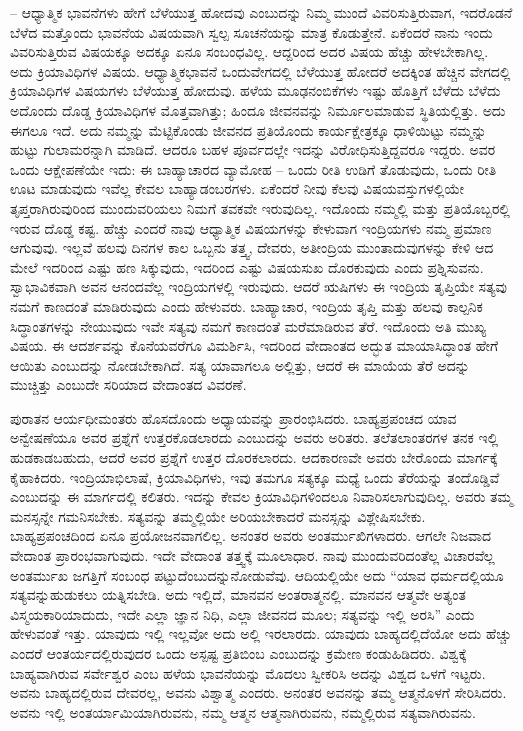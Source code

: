 – ಆಧ್ಯಾತ್ಮಿಕ ಭಾವನೆಗಳು ಹೇಗೆ ಬೆಳೆಯುತ್ತ ಹೋದವು ಎಂಬುದನ್ನು ನಿಮ್ಮ ಮುಂದೆ ವಿವರಿಸುತ್ತಿರುವಾಗ, ಇದರೊಡನೆ ಬೆಳೆದ ಮತ್ತೊಂದು ಭಾವನೆಯ ವಿಷಯವಾಗಿ ಸ್ವಲ್ಪ ಸೂಚನೆಯನ್ನು ಮಾತ್ರ ಕೊಡುತ್ತೇನೆ. ಏಕೆಂದರೆ ನಾನು ಇಂದು ವಿವರಿಸುತ್ತಿರುವ ವಿಷಯಕ್ಕೂ ಅದಕ್ಕೂ ಏನೂ ಸಂಬಂಧವಿಲ್ಲ. ಆದ್ದರಿಂದ ಅದರ ವಿಷಯ ಹೆಚ್ಚು ಹೇಳಬೇಕಾಗಿಲ್ಲ. ಅದು ಕ್ರಿಯಾವಿಧಿಗಳ ವಿಷಯ. ಆಧ್ಯಾತ್ಮಿಕಭಾವನೆ ಒಂದು\break ವೇಗದಲ್ಲಿ ಬೆಳೆಯುತ್ತ ಹೋದರೆ ಅದಕ್ಕಿಂತ ಹೆಚ್ಚಿನ ವೇಗದಲ್ಲಿ ಕ್ರಿಯಾವಿಧಿಗಳ ವಿಷಯಗಳು ಬೆಳೆಯುತ್ತ ಹೋದುವು. ಹಳೆಯ ಮೂಢನಂಬಿಕೆಗಳು ಇಷ್ಟು ಹೊತ್ತಿಗೆ ಬೆಳೆದು ಬೆಳೆದು ಅದೊಂದು ದೊಡ್ಡ ಕ್ರಿಯಾವಿಧಿಗಳ ಮೊತ್ತವಾಗಿತ್ತು; ಹಿಂದೂ ಜೀವನವನ್ನು ನಿರ್ಮೂಲಮಾಡುವ ಸ್ಥಿತಿಯಲ್ಲಿತ್ತು. ಅದು ಈಗಲೂ ಇದೆ. ಅದು ನಮ್ಮನ್ನು ಮೆಟ್ಟಿಕೊಂಡು ಜೀವನದ ಪ್ರತಿಯೊಂದು ಕಾರ್ಯಕ್ಷೇತ್ರಕ್ಕೂ ಧಾಳಿಯಿಟ್ಟು ನಮ್ಮನ್ನು ಹುಟ್ಟು ಗುಲಾಮರನ್ನಾಗಿ ಮಾಡಿದೆ. ಆದರೂ ಬಹಳ ಪೂರ್ವದಲ್ಲೇ ಇದನ್ನು ವಿರೋಧಿಸುತ್ತಿದ್ದವರೂ ಇದ್ದರು. ಅವರ ಒಂದು ಆಕ್ಷೇಪಣೆಯೇ ಇದು: ಈ ಬಾಹ್ಯಾಚಾರದ ವ್ಯಾಮೋಹ – ಒಂದು ರೀತಿ ಉಡಿಗೆ ತೊಡುವುದು, ಒಂದು ರೀತಿ ಊಟ ಮಾಡುವುದು ಇವೆಲ್ಲ ಕೇವಲ ಬಾಹ್ಯಾಡಂಬರಗಳು. ಏಕೆಂದರೆ ನೀವು ಕೆಲವು ವಿಷಯವಸ್ತುಗಳಲ್ಲಿಯೇ ತೃಪ್ತರಾಗಿರುವುರಿಂದ ಮುಂದುವರಿಯಲು ನಿಮಗೆ ತವಕವೇ ಇರುವುದಿಲ್ಲ. ಇದೊಂದು ನಮ್ಮಲ್ಲಿ ಮತ್ತು ಪ್ರತಿಯೊಬ್ಬರಲ್ಲಿ ಇರುವ ದೊಡ್ಡ ಕಷ್ಟ. ಹೆಚ್ಚು ಎಂದರೆ ನಾವು ಆಧ್ಯಾತ್ಮಿಕ ವಿಷಯಗಳನ್ನು ಕೇಳುವಾಗ ಇಂದ್ರಿಯಗಳು ನಮ್ಮ ಪ್ರಮಾಣ ಆಗುವುವು. ಇಲ್ಲವೆ ಹಲವು ದಿನಗಳ ಕಾಲ ಒಬ್ಬನು ತತ್ತ್ವ, ದೇವರು, ಅತೀಂದ್ರಿಯ ಮುಂತಾದುವುಗಳನ್ನು ಕೇಳಿ ಆದ ಮೇಲೆ ಇದರಿಂದ ಎಷ್ಟು ಹಣ ಸಿಕ್ಕುವುದು, ಇದರಿಂದ ಎಷ್ಟು ವಿಷಯಸುಖ ದೊರಕುವುದು ಎಂದು ಪ್ರಶ್ನಿಸುವನು. ಸ್ವಾಭಾವಿಕವಾಗಿ ಅವನ ಆನಂದವೆಲ್ಲ ಇಂದ್ರಿಯಗಳಲ್ಲಿ ಇರುವುದು. ಆದರೆ ಋಷಿಗಳು ಈ ಇಂದ್ರಿಯ ತೃಪ್ತಿಯೇ ಸತ್ಯವು ನಮಗೆ ಕಾಣದಂತೆ ಮಾಡಿರುವುದು ಎಂದು ಹೇಳುವರು. ಬಾಹ್ಯಾಚಾರ, ಇಂದ್ರಿಯ ತೃಪ್ತಿ ಮತ್ತು ಹಲವು ಕಾಲ್ಪನಿಕ ಸಿದ್ಧಾಂತಗಳನ್ನು ನೇಯುವುದು ಇವೇ ಸತ್ಯವು ನಮಗೆ ಕಾಣದಂತೆ ಮರೆಮಾಡಿರುವ ತೆರೆ. ಇದೊಂದು ಅತಿ ಮುಖ್ಯ ವಿಷಯ. ಈ ಆದರ್ಶವನ್ನು ಕೊನೆಯವರೆಗೂ ವಿಮರ್ಶಿಸಿ, ಇದರಿಂದ ವೇದಾಂತದ ಅದ್ಭುತ ಮಾಯಾಸಿದ್ಧಾಂತ ಹೇಗೆ ಆಯಿತು ಎಂಬುದನ್ನು ನೋಡಬೇಕಾಗಿದೆ. ಸತ್ಯ ಯಾವಾಗಲೂ ಅಲ್ಲಿತ್ತು, ಆದರೆ ಈ ಮಾಯೆಯ ತೆರೆ ಅದನ್ನು ಮುಚ್ಚಿತ್ತು ಎಂಬುದೇ ಸರಿಯಾದ ವೇದಾಂತದ ವಿವರಣೆ.

ಪುರಾತನ ಆರ್ಯಧೀಮಂತರು ಹೊಸದೊಂದು ಅಧ್ಯಾಯವನ್ನು ಪ್ರಾರಂಭಿಸಿದರು. ಬಾಹ್ಯಪ್ರಪಂಚದ ಯಾವ ಅನ್ವೇಷಣೆಯೂ ಅವರ ಪ್ರಶ್ನೆಗೆ ಉತ್ತರ\break ಕೊಡಲಾರದು ಎಂಬುದನ್ನು ಅವರು ಅರಿತರು. ತಲೆತಲಾಂತರಗಳ ತನಕ ಇಲ್ಲಿ ಹುಡಕಾಡಬಹುದು, ಆದರೆ ಅವರ ಪ್ರಶ್ನೆಗೆ ಉತ್ತರ ದೊರಕಲಾರದು. ಆದಕಾರಣವೇ ಅವರು ಬೇರೊಂದು ಮಾರ್ಗಕ್ಕೆ ಕೈಹಾಕಿದರು. ಇಂದ್ರಿಯಾಭಿಲಾಷೆ, ಕ್ರಿಯಾವಿಧಿಗಳು, ಇವು ತಮಗೂ ಸತ್ಯಕ್ಕೂ ಮಧ್ಯೆ ಒಂದು ತೆರೆಯನ್ನು ತಂದೊಡ್ಡಿವೆ ಎಂಬುದನ್ನು ಈ ಮಾರ್ಗದಲ್ಲಿ ಕಲಿತರು. ಇದನ್ನು ಕೇವಲ ಕ್ರಿಯಾವಿಧಿಗಳಿಂದಲೂ ನಿವಾರಿಸಲಾಗುವುದಿಲ್ಲ. ಅವರು ತಮ್ಮ ಮನಸ್ಸನ್ನೇ ಗಮನಿಸಬೇಕು. ಸತ್ಯವನ್ನು ತಮ್ಮಲ್ಲಿಯೇ ಅರಿಯಬೇಕಾದರೆ ಮನಸ್ಸನ್ನು ವಿಶ್ಲೇಷಿಸಬೇಕು. ಬಾಹ್ಯಪ್ರಪಂಚದಿಂದ ಏನೂ ಪ್ರಯೋಜನವಾಗಲಿಲ್ಲ. ಅನಂತರ ಅವರು ಅಂತರ್ಮುಖಿಗಳಾದರು. ಆಗಲೇ ನಿಜವಾದ ವೇದಾಂತ ಪ್ರಾರಂಭವಾಗುವುದು. ಇದೇ ವೇದಾಂತ ತತ್ತ್ವಕ್ಕೆ ಮೂಲಾಧಾರ. ನಾವು ಮುಂದುವರಿದಂತೆಲ್ಲ ವಿಚಾರವೆಲ್ಲ ಅಂತರ್ಮುಖ ಜಗತ್ತಿಗೆ ಸಂಬಂಧ ಪಟ್ಟುದೆಂಬುದನ್ನು\break ನೋಡುವೆವು. ಆದಿಯಲ್ಲಿಯೇ ಅದು “ಯಾವ ಧರ್ಮದಲ್ಲಿಯೂ ಸತ್ಯವನ್ನು\break ಹುಡುಕಲು ಯತ್ನಿಸಬೇಡಿ. ಅದು ಇಲ್ಲಿದೆ, ಮಾನವನ ಅಂತರಾತ್ಮನಲ್ಲಿ. ಮಾನವನ ಆತ್ಮವೇ ಅತ್ಯಂತ ವಿಸ್ಮಯಕಾರಿಯಾದುದು, ಇದೇ ಎಲ್ಲಾ ಜ್ಞಾನ ನಿಧಿ, ಎಲ್ಲಾ ಜೀವನದ ಮೂಲ; ಸತ್ಯವನ್ನು ಇಲ್ಲಿ ಅರಸಿ'' ಎಂದು ಹೇಳುವಂತೆ ಇತ್ತು. ಯಾವುದು ಇಲ್ಲಿ ಇಲ್ಲವೋ ಅದು ಅಲ್ಲಿ ಇರಲಾರದು. ಯಾವುದು ಬಾಹ್ಯದಲ್ಲಿದೆಯೋ ಅದು ಹೆಚ್ಚು ಎಂದರೆ ಆಂತರ್ಯದಲ್ಲಿರುವುದರ ಒಂದು ಅಸ್ಪಷ್ಟ ಪ್ರತಿಬಿಂಬ ಎಂಬುದನ್ನು ಕ್ರಮೇಣ ಕಂಡುಹಿಡಿದರು. ವಿಶ್ವಕ್ಕೆ ಬಾಹ್ಯವಾಗಿರುವ ಸರ್ವೇಶ್ವರ ಎಂಬ ಹಳೆಯ ಭಾವನೆಯನ್ನು ಮೊದಲು ಸ್ವೀಕರಿಸಿ ಅದನ್ನು ವಿಶ್ವದ ಒಳಗೆ ಇಟ್ಟರು. ಅವನು ಬಾಹ್ಯದಲ್ಲಿರುವ ದೇವರಲ್ಲ, ಅವನು ವಿಶ್ವಾತ್ಮ ಎಂದರು. ಅನಂತರ ಅವನನ್ನು ತಮ್ಮ ಆತ್ಮನೊಳಗೆ ಸೇರಿಸಿದರು. ಅವನು ಇಲ್ಲಿ ಅಂತರ್ಯಾಮಿಯಾಗಿರುವನು, ನಮ್ಮ ಆತ್ಮನ ಆತ್ಮನಾಗಿರುವನು, ನಮ್ಮಲ್ಲಿರುವ ಸತ್ಯವಾಗಿರುವನು.

